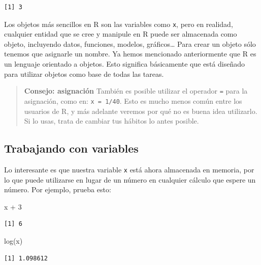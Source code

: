 \documentclass[
  letterpaper,
  DIV=11,
  numbers=noendperiod]{scrreprt}
\newenvironment{Shaded}{\begin{snugshade}}{\end{snugshade}}
\newcommand{\DecValTok}[1]{\textcolor[rgb]{0.68,0.00,0.00}{#1}}
\newcommand{\FunctionTok}[1]{\textcolor[rgb]{0.28,0.35,0.67}{#1}}
\newcommand{\NormalTok}[1]{\textcolor[rgb]{0.00,0.23,0.31}{#1}}
\newcommand{\SpecialCharTok}[1]{\textcolor[rgb]{0.37,0.37,0.37}{#1}}
\begin{document}
\begin{verbatim}
[1] 3
\end{verbatim}

Los objetos más sencillos en R son las variables como \texttt{x}, pero
en realidad, cualquier entidad que se cree y manipule en R puede ser
almacenada como objeto, incluyendo datos, funciones, modelos,
gráficos\ldots{} Para crear un objeto sólo tenemos que asignarle un
nombre. Ya hemos mencionado anteriormente que R es un lenguaje orientado
a objetos. Esto significa básicamente que está diseñado para utilizar
objetos como base de todas las tareas.

\begin{quote}
\textbf{Consejo: asignación} También es posible utilizar el operador
\texttt{=} para la asignación, como en: \texttt{x\ =\ 1/40}. Esto es
mucho menos común entre los usuarios de R, y más adelante veremos por
qué no es buena idea utilizarlo. Si lo usas, trata de cambiar tus
hábitos lo antes posible.
\end{quote}

\hypertarget{trabajando-con-variables}{%
\subsection{Trabajando con variables}\label{trabajando-con-variables}}

Lo interesante es que nuestra variable \texttt{x} está ahora almacenada
en memoria, por lo que puede utilizarse en lugar de un número en
cualquier cálculo que espere un número. Por ejemplo, prueba esto:

\begin{Shaded}
\begin{Highlighting}[]
\NormalTok{x }\SpecialCharTok{+} \DecValTok{3}
\end{Highlighting}
\end{Shaded}

\begin{verbatim}
[1] 6
\end{verbatim}

\begin{Shaded}
\begin{Highlighting}[]
\FunctionTok{log}\NormalTok{(x)}
\end{Highlighting}
\end{Shaded}

\begin{verbatim}
[1] 1.098612
\end{verbatim}
\end{document}
